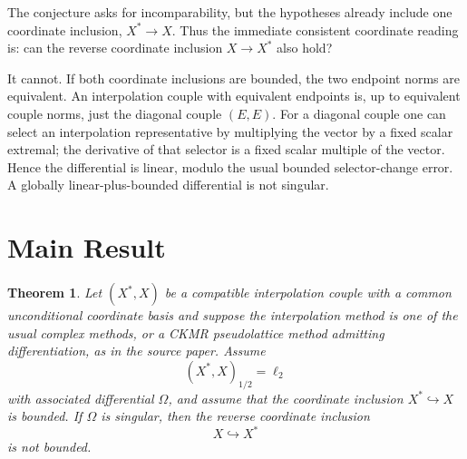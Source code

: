 \documentclass[11pt]{amsart}
\newtheorem{theorem}{Theorem}
\theoremstyle{remark}
\newcommand{\elltwo}{\ell_2}
\newcommand{\Om}{\Omega}
\begin{document}
The conjecture asks for incomparability, but the hypotheses already include one
coordinate inclusion, $X^*\to X$.  Thus the immediate consistent coordinate
reading is: can the reverse coordinate inclusion $X\to X^*$ also hold?

It cannot.  If both coordinate inclusions are bounded, the two endpoint norms are
equivalent.  An interpolation couple with equivalent endpoints is, up to
equivalent couple norms, just the diagonal couple $(E,E)$.  For a diagonal couple
one can select an interpolation representative by multiplying the vector by a
fixed scalar extremal; the derivative of that selector is a fixed scalar multiple
of the vector.  Hence the differential is linear, modulo the usual bounded
selector-change error.  A globally linear-plus-bounded differential is not
singular.

\section{Main Result}

\begin{theorem}
Let $(X^*,X)$ be a compatible interpolation couple with a common unconditional
coordinate basis and suppose the interpolation method is one of the usual
complex methods, or a CKMR pseudolattice method admitting differentiation, as in
the source paper.  Assume
\[
  (X^*,X)_{1/2}=\elltwo
\]
with associated differential $\Om$, and assume that the coordinate inclusion
$X^*\hookrightarrow X$ is bounded.  If $\Om$ is singular, then the reverse
coordinate inclusion
\[
  X\hookrightarrow X^*
\]
is not bounded.
\end{theorem}
\end{document}
